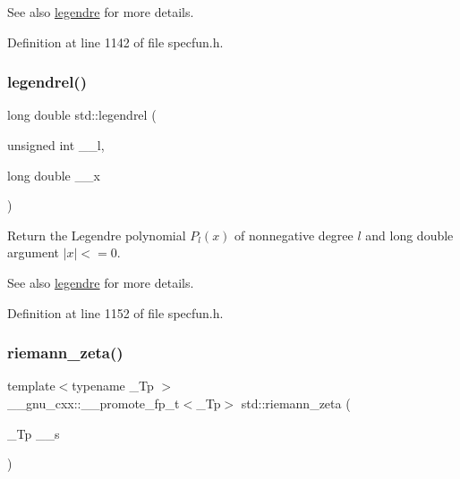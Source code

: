 \begin{DoxySeeAlso}{See also}
\hyperlink{group__tr29124__math__spec__func_ga327bb7686d2e63d85e8c6b1b42b3b29e}{legendre} for more details. 
\end{DoxySeeAlso}


Definition at line 1142 of file specfun.\+h.

\mbox{\label{group__tr29124__math__spec__func_ga1b39bc22e3cc4860d08eb54099460391}} 
\subsubsection{\texorpdfstring{legendrel()}{legendrel()}}
{\footnotesize\ttfamily long double std\+::legendrel (\begin{DoxyParamCaption}\item[{unsigned int}]{\+\_\+\+\_\+l,  }\item[{long double}]{\+\_\+\+\_\+x }\end{DoxyParamCaption})\hspace{0.3cm}{\ttfamily [inline]}}

Return the Legendre polynomial $ P_l(x) $ of nonnegative degree $ l $ and {\ttfamily long double} argument $ |x| <= 0 $.

\begin{DoxySeeAlso}{See also}
\hyperlink{group__tr29124__math__spec__func_ga327bb7686d2e63d85e8c6b1b42b3b29e}{legendre} for more details. 
\end{DoxySeeAlso}


Definition at line 1152 of file specfun.\+h.

\mbox{\label{group__tr29124__math__spec__func_ga57bb10396587a75e909d3c6e47dadf20}} 
\subsubsection{\texorpdfstring{riemann\+\_\+zeta()}{riemann\_zeta()}}
{\footnotesize\ttfamily template$<$typename \+\_\+\+Tp $>$ \\
\+\_\+\+\_\+gnu\+\_\+cxx\+::\+\_\+\+\_\+promote\+\_\+fp\+\_\+t$<$\+\_\+\+Tp$>$ std\+::riemann\+\_\+zeta (\begin{DoxyParamCaption}\item[{\+\_\+\+Tp}]{\+\_\+\+\_\+s }\end{DoxyParamCaption})\hspace{0.3cm}{\ttfamily [inline]}}

